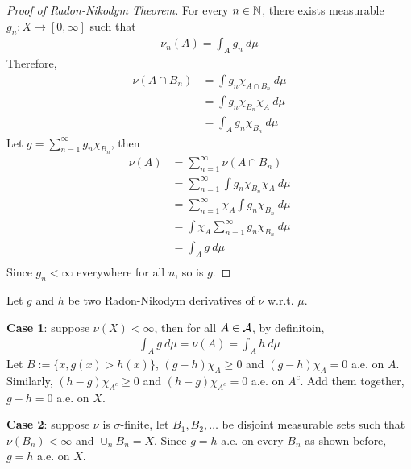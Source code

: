 \documentclass[11pt]{article}
\newcommand{\dmu}[0]{\ d\mu}
\begin{document}
\begin{proof}[Proof of Radon-Nikodym Theorem]
		For every $n \in \mathbb{N}$, there exists measurable $g_n: X \to [0,\infty]$ such that
		\begin{align}
			\nu_n(A) = \int_A g_n\dmu
		\end{align}
		Therefore,
		\begin{align}
			 \nu(A \cap B_n) &= \int g_n \chi_{A \cap B_n}\dmu \\
			 &= \int g_n \chi_{B_n} \chi_A\dmu \\
			 &= \int_A g_n \chi_{B_n}\dmu
		\end{align}
		Let $g = \sum_{n=1}^\infty g_n \chi_{B_n}$, then
		\begin{align}
			\nu(A) &= \sum_{n=1}^\infty \nu(A \cap B_n) \\
			&=\sum_{n=1}^\infty \int g_n \chi_{B_n} \chi_A\dmu \\
			&=\sum_{n=1}^\infty \chi_A \int g_n \chi_{B_n} \dmu \\
			&=\int \chi_A \sum_{n=1}^\infty g_n \chi_{B_n} \dmu \\
			&=\int_A g \dmu \\
		\end{align}
		Since $g_n < \infty$ everywhere for all $n$, so is $g$.
	\end{proof}
	
	\begin{remark}
		Let $g$ and $h$ be two Radon-Nikodym derivatives of $\nu$ w.r.t. $\mu$.

		\textbf{Case 1}: suppose $\nu(X) < \infty$, then for all $A \in \mathcal{{A}}$, by definitoin,
		\begin{align}
			\int_A g\dmu = \nu(A) = \int_A h\dmu
		\end{align}
		Let $B := \{x, g(x) > h(x)\}$, $(g-h) \chi_A \geq 0$ and $(g-h) \chi_A = 0$ a.e. on $A$.
		Similarly, $(h-g) \chi_{A^c} \geq 0$ and $(h-g)\chi_{A^c} = 0$ a.e. on $A^c$.
		Add them together, $g - h = 0$ a.e. on $X$.
		
		\textbf{Case 2}: suppose $\nu$ is $\sigma$-finite, let $B_1, B_2, \dots$ be disjoint measurable sets such that $\nu(B_n) < \infty$ and $\cup_n B_n = X$.
		Since $g = h$ a.e. on every $B_n$ as shown before, $g = h$ a.e. on $X$.
	\end{remark}
	
\end{document}
